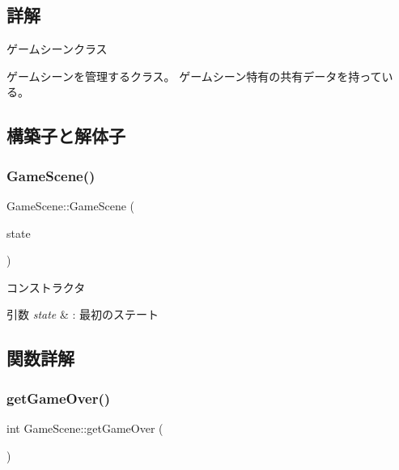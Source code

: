 \subsection{詳解}
ゲームシーンクラス 

ゲームシーンを管理するクラス。 ゲームシーン特有の共有データを持っている。 

\subsection{構築子と解体子}
\mbox{\label{class_game_scene_a7c9e00b7dddd016d9c07f8cb49e7bbb2}} 
\subsubsection{\texorpdfstring{Game\+Scene()}{GameScene()}}
{\footnotesize\ttfamily Game\+Scene\+::\+Game\+Scene (\begin{DoxyParamCaption}\item[{\mbox{\hyperlink{class_scene_base_1_1_state_abstract}{State\+Abstract}} $\ast$}]{state }\end{DoxyParamCaption})\hspace{0.3cm}{\ttfamily [inline]}}



コンストラクタ 


\begin{DoxyParams}{引数}
{\em state} & \+: 最初のステート \\
\hline
\end{DoxyParams}


\subsection{関数詳解}
\mbox{\label{class_game_scene_a2f8413f473bc9a937fa02bfd4678d61d}} 
\subsubsection{\texorpdfstring{get\+Game\+Over()}{getGameOver()}}
{\footnotesize\ttfamily int Game\+Scene\+::get\+Game\+Over (\begin{DoxyParamCaption}{ }\end{DoxyParamCaption})\hspace{0.3cm}{\ttfamily [inline]}}

